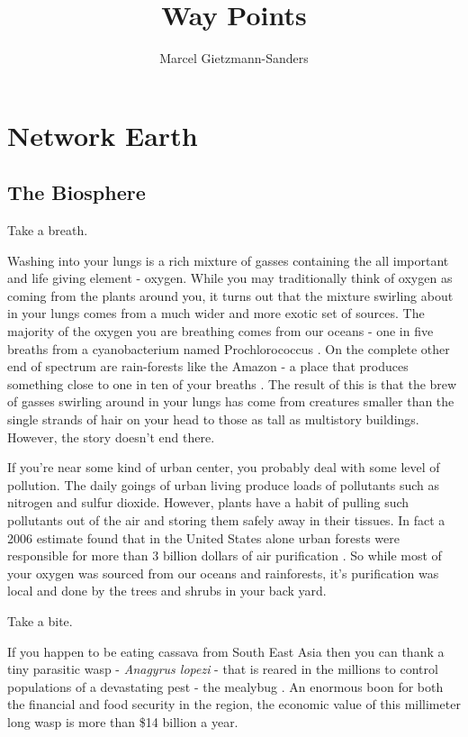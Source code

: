 \documentclass[11pt,a5paper]{book}
\title{Way Points}
\author{Marcel Gietzmann-Sanders}
\begin{document}
\maketitle
\tableofcontents
\newpage
\chapter{Network Earth}
\section{The Biosphere}
Take a breath. 
\newline

Washing into your lungs is a rich mixture of gasses containing the all important and life giving element - oxygen. While you may traditionally think of oxygen as coming from the plants around you, it turns out that the mixture swirling about in your lungs comes from a much wider and more exotic set of sources. The majority of the oxygen you are breathing comes from our oceans - one in five breaths from a cyanobacterium named Prochlorococcus \cite{kmorsink}. On the complete other end of spectrum are rain-forests like the Amazon - a place that produces something close to one in ten of your breaths \cite{ymalhi}. The result of this is that the brew of gasses swirling around in your lungs has come from creatures smaller than the single strands of hair on your head to those as tall as multistory buildings. However, the story doesn't end there.
\newline

If you're near some kind of urban center, you probably deal with some level of pollution. The daily goings of urban living produce loads of pollutants such as nitrogen and sulfur dioxide. However, plants have a habit of pulling such pollutants out of the air and storing them safely away in their tissues. In fact a 2006 estimate found that in the United States alone urban forests were responsible for more than 3 billion dollars of air purification \cite{dnowak}. So while most of your oxygen was sourced from our oceans and rainforests, it's purification was local and done by the trees and shrubs in your back yard. 
\newline

Take a bite. 
\newline 

If you happen to be eating cassava from South East Asia then you can thank a tiny parasitic wasp - \textit{Anagyrus lopezi} - that is reared in the millions to control populations of a devastating pest - the mealybug \cite{wpark}. An enormous boon for both the financial and food security in the region, the economic value of this millimeter long wasp is more than \$14 billion a year. 
\newline
\end{document}
